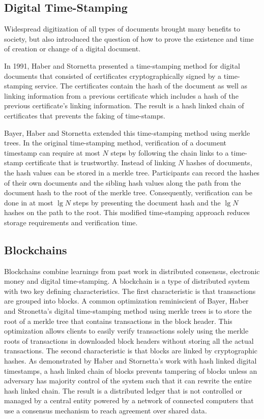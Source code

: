 \subsection{Digital Time-Stamping}

Widespread digitization of all types of documents brought many benefits to
society, but also introduced the question of how to prove the existence and time of creation or change of a
digital document.

In 1991, Haber and Stornetta presented a time-stamping method for digital
documents that consisted of certificates cryptographically signed by a time-stamping service. The
certificates contain the hash of the document as well as linking information from a
previous certificate which includes a hash of the previous certificate's linking
information\cite{haber1991}. The result is a hash linked chain of certificates
that prevents the faking of time-stamps.

Bayer, Haber and Stornetta extended this time-stamping method using merkle
trees. In the original time-stamping method, verification of a document
timestamp can require at most $N$ steps by following the chain links to a
time-stamp certificate that is trustworthy\cite{bayer1993}. Instead of linking $N$
hashes of documents, the hash values can be stored in a merkle tree.
Participants can record the hashes of their own documents and the sibling hash
values along the path from the document hash to the root of the merkle tree.
Consequently, verification can be done in at most $\lg N$ steps by presenting the
document hash and the $\lg N$ hashes on the path to the root. This modified
time-stamping approach reduces storage requirements and verification time.

\subsection{Blockchains}
\label{sec:blockchains}

Blockchains combine learnings from past work in distributed consensus,
electronic money and digital time-stamping. A blockchain is a type of distributed system with two key defining
characteristics. The first characteristic is that transactions are grouped into blocks. A
common optimization reminiscient of Bayer, Haber and
Stronetta's digital time-stamping method using merkle trees is to store the root of a merkle tree that contains
transactions in the block header. This optimization allows clients to easily
verify transactions solely using the merkle roots of transactions in downloaded block headers without storing all
the actual transactions. The second characteristic is that blocks
are linked by cryptographic hashes. As demonstrated by Haber and Stornetta's
work with hash linked digital timestamps, a hash linked chain of blocks prevents
tampering of blocks unless an adversary has majority control of the system such
that it can rewrite the entire hash linked chain. The result is a distributed ledger that is not controlled or managed by a
central entity powered by a network of connected computers that use a consensus
mechanism to reach agreement over shared data\cite{whatisblockchain}.

